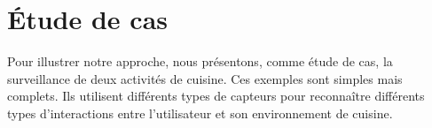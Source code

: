 


\section{Étude de cas}
Pour illustrer notre approche, nous présentons, comme étude de cas, la surveillance de deux activités de cuisine. Ces exemples sont simples mais complets. Ils utilisent différents types de capteurs pour reconnaître différents types d'interactions entre l'utilisateur et son environnement de cuisine.

